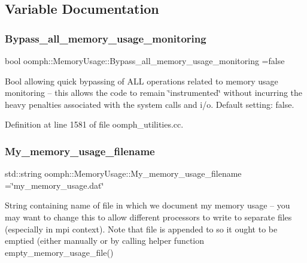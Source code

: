 \subsection{Variable Documentation}
\mbox{\label{namespaceoomph_1_1MemoryUsage_a1b52934e2d3ddd6779f5f9581d14abc1}} 
\subsubsection{\texorpdfstring{Bypass\+\_\+all\+\_\+memory\+\_\+usage\+\_\+monitoring}{Bypass\_all\_memory\_usage\_monitoring}}
{\footnotesize\ttfamily bool oomph\+::\+Memory\+Usage\+::\+Bypass\+\_\+all\+\_\+memory\+\_\+usage\+\_\+monitoring =false}



Bool allowing quick bypassing of A\+LL operations related to memory usage monitoring -- this allows the code to remain \char`\"{}instrumented\char`\"{} without incurring the heavy penalties associated with the system calls and i/o. Default setting\+: false. 



Definition at line 1581 of file oomph\+\_\+utilities.\+cc.

\mbox{\label{namespaceoomph_1_1MemoryUsage_aa764cf2d9bfd321a3784aafdd32714bf}} 
\subsubsection{\texorpdfstring{My\+\_\+memory\+\_\+usage\+\_\+filename}{My\_memory\_usage\_filename}}
{\footnotesize\ttfamily std\+::string oomph\+::\+Memory\+Usage\+::\+My\+\_\+memory\+\_\+usage\+\_\+filename =\char`\"{}my\+\_\+memory\+\_\+usage.\+dat\char`\"{}}



String containing name of file in which we document my memory usage -- you may want to change this to allow different processors to write to separate files (especially in mpi context). Note that file is appended to so it ought to be emptied (either manually or by calling helper function empty\+\_\+memory\+\_\+usage\+\_\+file() 



